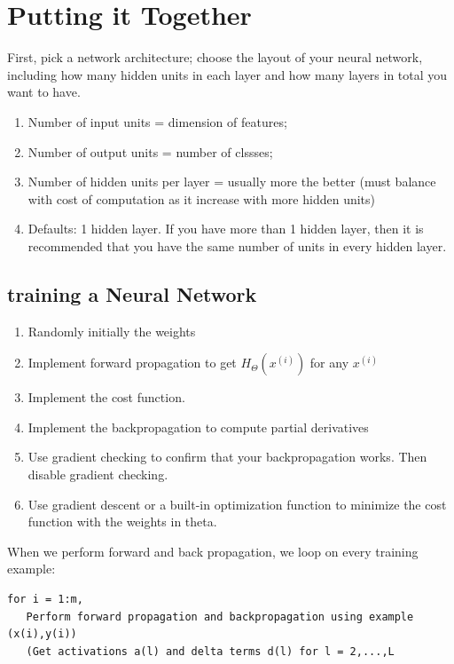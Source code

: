 \documentclass[10pt,a4paper,UTF8]{article}
\begin{document}
\section{Putting it Together}
\label{sec:orgefeb562}


First, pick a network architecture; choose the layout of your neural network, including how many hidden units in each layer and how many layers in total you want to have.

\begin{enumerate}
\item Number of input units = dimension of features;
\item Number of output units = number of clssses;
\item Number of hidden units per layer = usually more the better (must balance with cost of computation as it increase with more hidden units)
\item Defaults: 1 hidden layer. If you have more than 1 hidden layer, then it is recommended that you have the same number of units in every hidden layer.
\end{enumerate}

\subsection{training a Neural Network}
\label{sec:orgd302627}

\begin{enumerate}
\item Randomly initially the weights
\item Implement forward propagation to get \(H_{\Theta}(x^{(i)})\) for any \(x^{(i)}\)
\item Implement the cost function.
\item Implement the backpropagation to compute partial derivatives
\item Use gradient checking to confirm that your backpropagation works. Then disable gradient checking.
\item Use gradient descent or a built-in optimization function to minimize the cost function with the weights in theta.
\end{enumerate}

When we perform forward and back propagation, we loop on every training example:
\lstset{language=matlab,label= ,caption= ,captionpos=b,numbers=none}
\begin{lstlisting}
for i = 1:m,
   Perform forward propagation and backpropagation using example (x(i),y(i))
   (Get activations a(l) and delta terms d(l) for l = 2,...,L
\end{lstlisting}
\end{document}
